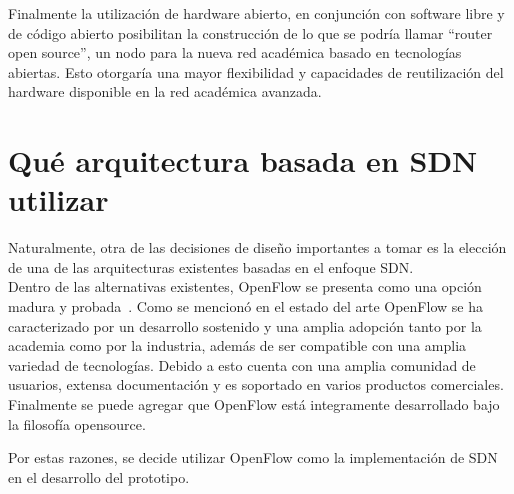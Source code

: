 Finalmente la utilizaci\'on de hardware abierto, en conjunci\'on con software libre y de código abierto posibilitan la construcci\'on de lo que se podría llamar “router open source”, un nodo para la nueva red académica basado en tecnologías abiertas. Esto otorgaría una mayor flexibilidad y capacidades de reutilizaci\'on del hardware disponible en la red académica avanzada.

\section[Qu\'e arquitectura basada en SDN utilizar]{Qu\'e arquitectura basada en SDN utilizar}


 
Naturalmente, otra de las decisiones de dise\~no importantes a tomar es la elecci\'on de una de las arquitecturas existentes basadas en el enfoque SDN.\\
  
Dentro de las alternativas existentes, OpenFlow se presenta como una opci\'on madura y probada~\citep{Ofelia}. Como se mencion\'o en el estado del arte OpenFlow  se ha caracterizado por un desarrollo sostenido y una amplia adopci\'on tanto por la academia como por la industria, adem\'as de ser compatible con una amplia variedad de tecnolog\'ias. Debido a esto cuenta con una amplia comunidad de usuarios, extensa documentaci\'on y es soportado en varios productos comerciales\citep{Pica8}\citep{HP}\citep{Centec}\citep{SDNProductlist}. Finalmente se puede agregar que OpenFlow est\'a integramente desarrollado bajo la filosof\'ia opensource. 

Por estas razones, se decide utilizar OpenFlow como la implementaci\'on de SDN en el desarrollo del prototipo.\\





